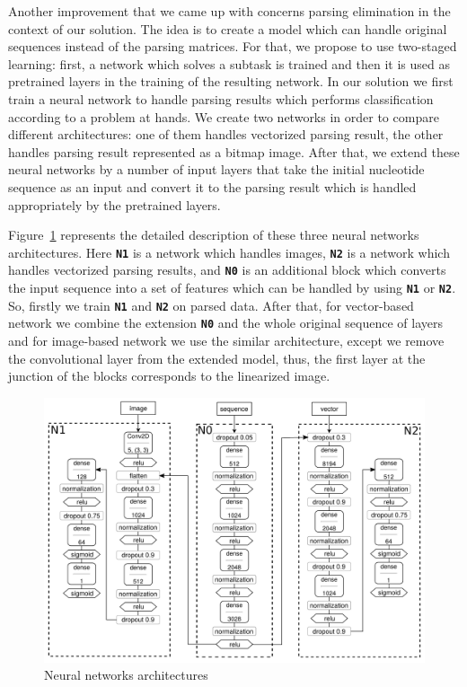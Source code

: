 \documentclass[runningheads]{llncs}
\begin{document}
Another improvement that we came up with concerns parsing elimination in the context of our solution. The idea is to create a model which can handle original sequences instead of the parsing matrices. For that, we propose to use two-staged learning: first, a network which solves a subtask is trained and then it is used as pretrained layers in the training of the resulting network.
In our solution we first train a neural network to handle parsing results which performs classification according to a problem at hands. We create two networks in order to compare different architectures: one of them handles vectorized parsing result, the other handles parsing result represented as a bitmap image. After that, we extend these neural networks by a number of input layers that take the initial nucleotide sequence as an input and convert it to the parsing result which is handled appropriately by the pretrained layers.

Figure~\ref{nn} represents the detailed description of these three neural networks architectures.
Here \textbf{\texttt{N1}} is a network which handles images, \textbf{\texttt{N2}} is a network which handles vectorized parsing results, and \textbf{\texttt{N0}} is an additional block which converts the input sequence into a set of features which can be handled by using \textbf{\texttt{N1}} or \textbf{\texttt{N2}}. So, firstly we train \textbf{\texttt{N1}} and \textbf{\texttt{N2}} on parsed data. After that, for vector-based network we combine the extension \textbf{\texttt{N0}} and the whole original sequence of layers and for image-based network we use the similar architecture, except we remove the convolutional layer from the extended model, thus, the first layer at the junction of the blocks corresponds to the linearized image.

\begin{figure}[h]
\begin{center}
\centering
\includegraphics[width=12cm]{figures/nn_arch.pdf}
\caption{Neural networks architectures}
\label{nn}
\end{center}
\end{figure}
\end{document}
